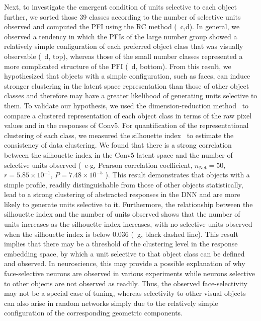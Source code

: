 \documentclass[final,3p,times,twocolumn]{elsarticle}
\begin{document}
Next, to investigate the emergent condition of units selective to each object further, we sorted those 39 classes according to the number of selective units observed and computed the PFI using the RC method (~c,d).
In general, we observed a tendency in which the PFIs of the large number group showed a relatively simple configuration of each preferred object class that was visually observable (~d, top), 
whereas those of the small number classes represented a more complicated structure of the PFI (~d, bottom).
From this result, we hypothesized that objects with a simple configuration, such as faces, can induce stronger clustering in the latent space representation than those of other object classes and therefore may have a greater likelihood of generating units selective to them.
To validate our hypothesis, we used the dimension-reduction method~\cite{wold1987principal} to compare a clustered representation of each object class in terms of the raw pixel values and in the responses of Conv5.
For quantification of the representational clustering of each class, we measured the silhouette index~\cite{kaufman2009finding} to estimate the consistency of data clustering.
We found that there is a strong correlation between the silhouette index in the Conv5 latent space and the number of selective units observed
(~e-g, Pearson correlation coefficient,
$ n_\textrm{Net} = 50 $,
$ r = 5.85 \times 10^{-1} $,
$ P = 7.48 \times 10^{-5} $
).
This result demonstrates that objects with a simple profile, readily distinguishable from those of other objects statistically, lead to a strong clustering of abstracted responses in the DNN and are more likely to generate units selective to it.
Furthermore, the relationship between the silhouette index and the number of units observed shows that the number of units increases as the silhouette index increases,
with no selective units observed when the silhouette index is below 0.036 (~g, black dashed line).
This result implies that there may be a threshold of the clustering level in the response embedding space, by which a unit selective to that object class can be defined and observed.
In neuroscience, this may provide a possible explanation of why face-selective neurons are observed in various experiments while neurons selective to other objects are not observed as readily.
Thus, the observed face-selectivity may not be a special case of tuning, 
whereas selectivity to other visual objects can also arise in random networks simply due to the relatively simple configuration of the corresponding geometric components.
\end{document}
